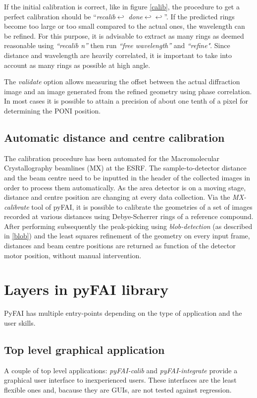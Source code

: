 \documentclass{iucr}
\begin{document}
If the initial calibration is correct, like in figure \ref{calib}, the procedure
to get a perfect calibration should be ``\textit{recalib}$\hookleftarrow $
\textit{done}$\hookleftarrow \hookleftarrow $''.
If the predicted rings become too large or too small compared
to the actual ones, the wavelength can be refined.
For this purpose, it is advisable to  extract as many rings as
deemed reasonable using \textit{``recalib n''} then run \textit{``free wavelength''} and
\textit{``refine"}.%
Since distance and wavelength are
heavily correlated, it is important to take into account as many rings as
possible at high angle.

The \textit{validate} option allows measuring the offset between the actual
diffraction image and an image generated from the refined geometry using phase
correlation.
In most cases it is possible to attain a precision of about one tenth of a pixel
for determining the PONI position.

\subsection{Automatic distance and centre calibration}
The calibration procedure has been automated for the  Macromolecular
Crystallography beamlines (MX) at the ESRF.
The sample-to-detector distance and the beam centre need to be inputted in the
header of the collected images in order to process them automatically.
As the area detector is on a moving stage, distance and centre position are
changing at every data collection.
Via the \textit{MX-calibrate} tool of pyFAI, it is possible to calibrate the
geometries of a set of images recorded at various distances using Debye-Scherrer
rings of a reference compound.
After performing subsequently the peak-picking using \textit{blob-detection}
(as described in \ref{blob}) and the least squares refinement of the geometry on
every input frame, distances and beam centre positions are returned as function
of the detector motor position, without manual intervention.

\section{Layers in pyFAI library}
PyFAI has multiple
entry-points depending on the type of application and the user skills.

\subsection{Top level graphical application}
A couple of top level applications: \textit{pyFAI-calib} and
\textit{pyFAI-integrate} provide a graphical user interface to inexperienced
users. 
These interfaces are the least flexible ones and, bacause they are
GUIs, are not tested against regression.
\end{document}
